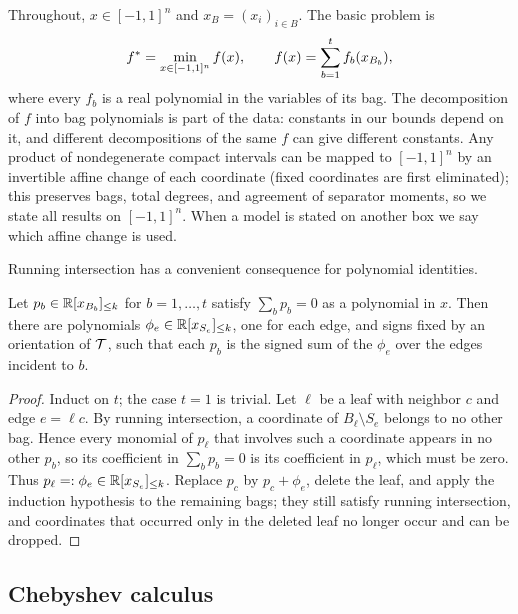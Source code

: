 Throughout, $x\in[-1,1]^n$ and $x_B=(x_i)_{i\in B}$. The basic problem is
\begin{equation}\label{eq:set-problem}
  f^{*}=\min_{x\in[-1,1]^n} f(x),\qquad
  f(x)=\sum_{b=1}^t f_b(x_{B_b}),
\end{equation}
where every $f_b$ is a real polynomial in the variables of its bag. The
decomposition of $f$ into bag polynomials is part of the data: constants in
our bounds depend on it, and different decompositions of the same $f$ can
give different constants. Any product of nondegenerate compact intervals
can be mapped to $[-1,1]^n$ by an invertible affine change of each
coordinate (fixed coordinates are first eliminated); this preserves
bags, total degrees, and agreement of separator moments, so we state all
results on $[-1,1]^n$. When a model is stated on another box we say which
affine change is used.

Running intersection has a convenient consequence for polynomial identities.

\begin{lemma}\label{lem:zero-decomposition}
Let $p_b\in\mathbb{R}[x_{B_b}]_{\le k}$ for $b=1,\dots,t$ satisfy $\sum_b p_b=0$ as a
polynomial in $x$. Then there are polynomials
$\phi_e\in\mathbb{R}[x_{S_e}]_{\le k}$, one for each edge, and signs fixed by an
orientation of $\mathcal{T}$, such that each $p_b$ is the signed sum of the
$\phi_e$ over the edges incident to $b$.
\end{lemma}

\begin{proof}
Induct on $t$; the case $t=1$ is trivial. Let $\ell$ be a leaf with
neighbor $c$ and edge $e=\ell c$. By running intersection, a coordinate of
$B_\ell\setminus S_e$ belongs to no other bag. Hence every monomial of
$p_\ell$ that involves such a coordinate appears in no other $p_b$, so its
coefficient in $\sum_b p_b=0$ is its coefficient in $p_\ell$, which must be
zero. Thus $p_\ell=:\phi_e\in\mathbb{R}[x_{S_e}]_{\le k}$. Replace $p_c$ by
$p_c+\phi_e$, delete the leaf, and apply the induction hypothesis to the
remaining bags; they still satisfy running intersection, and coordinates
that occurred only in the deleted leaf no longer occur and can be
dropped.
\end{proof}

\subsection{Chebyshev calculus}\label{sec:chebyshev}

